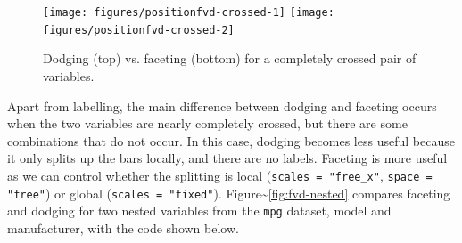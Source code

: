 \begin{figure}
\texttt{[image: figures/positionfvd-crossed-1]} \texttt{[image: figures/positionfvd-crossed-2]} \caption{Dodging (top) vs. faceting (bottom) for a completely crossed pair of variables.\label{fig:fvd-crossed}}
\end{figure}

Apart from labelling, the main difference between dodging and faceting
occurs when the two variables are nearly completely crossed, but there
are some combinations that do not occur. In this case, dodging becomes
less useful because it only splits up the bars locally, and there are no
labels. Faceting is more useful as we can control whether the splitting
is local (\texttt{scales = "free\_x"}, \texttt{space = "free"}) or
global (\texttt{scales = "fixed"}).
Figure\textasciitilde{}\ref{fig:fvd-nested} compares faceting and
dodging for two nested variables from the \texttt{mpg} dataset, model
and manufacturer, with the code shown below.

\begin{Shaded}
\end{Shaded}

